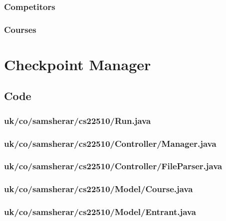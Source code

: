 \documentclass[10pt, a4paper]{article}
\begin{document}
\subsubsection{Competitors}


\subsubsection{Courses}


\newpage

\section{Checkpoint Manager}
\lstset{breakatwhitespace=false}
\subsection{Code}

\subsubsection{uk/co/samsherar/cs22510/Run.java}


\subsubsection{uk/co/samsherar/cs22510/Controller/Manager.java}


\subsubsection{uk/co/samsherar/cs22510/Controller/FileParser.java}


\subsubsection{uk/co/samsherar/cs22510/Model/Course.java}


\subsubsection{uk/co/samsherar/cs22510/Model/Entrant.java}

\end{document}
